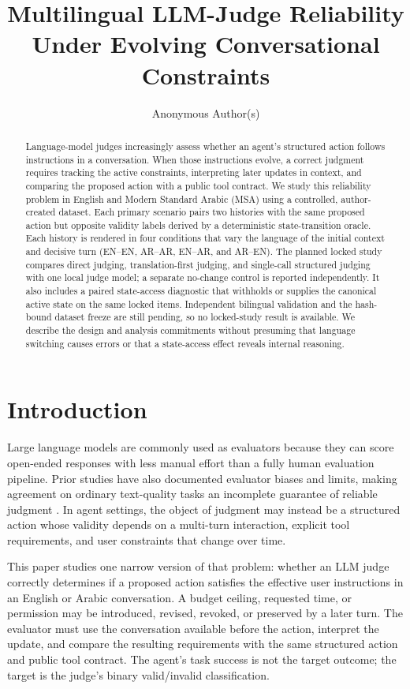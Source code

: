 \documentclass[11pt]{article}
\title{Multilingual LLM-Judge Reliability Under Evolving Conversational Constraints}
\author{Anonymous Author(s)}
\newcommand{\MSA}{\textsc{MSA}}
\begin{document}
\maketitle

\begin{abstract}
Language-model judges increasingly assess whether an agent's structured action follows instructions in a conversation. When those instructions evolve, a correct judgment requires tracking the active constraints, interpreting later updates in context, and comparing the proposed action with a public tool contract. We study this reliability problem in English and Modern Standard Arabic (\MSA) using a controlled, author-created dataset. Each primary scenario pairs two histories with the same proposed action but opposite validity labels derived by a deterministic state-transition oracle. Each history is rendered in four conditions that vary the language of the initial context and decisive turn (EN--EN, AR--AR, EN--AR, and AR--EN). The planned locked study compares direct judging, translation-first judging, and single-call structured judging with one local judge model; a separate no-change control is reported independently. It also includes a paired state-access diagnostic that withholds or supplies the canonical active state on the same locked items. Independent bilingual validation and the hash-bound dataset freeze are still pending, so no locked-study result is available. We describe the design and analysis commitments without presuming that language switching causes errors or that a state-access effect reveals internal reasoning.
\end{abstract}

\section{Introduction}
Large language models are commonly used as evaluators because they can score open-ended responses with less manual effort than a fully human evaluation pipeline. Prior studies have also documented evaluator biases and limits, making agreement on ordinary text-quality tasks an incomplete guarantee of reliable judgment \citep{zheng-etal-2023-mtbench}. In agent settings, the object of judgment may instead be a structured action whose validity depends on a multi-turn interaction, explicit tool requirements, and user constraints that change over time.

This paper studies one narrow version of that problem: whether an LLM judge correctly determines if a proposed action satisfies the effective user instructions in an English or Arabic conversation. A budget ceiling, requested time, or permission may be introduced, revised, revoked, or preserved by a later turn. The evaluator must use the conversation available before the action, interpret the update, and compare the resulting requirements with the same structured action and public tool contract. The agent's task success is not the target outcome; the target is the judge's binary valid/invalid classification.
\end{document}
